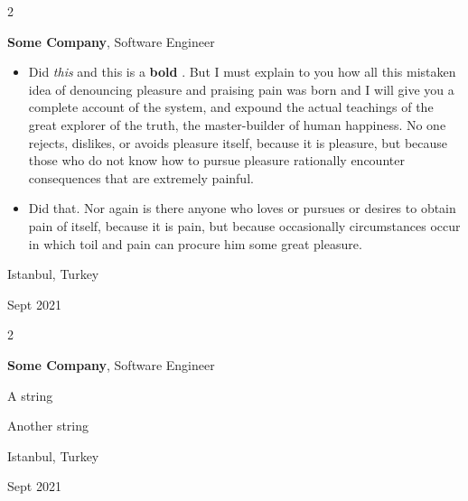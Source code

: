 \documentclass[10pt, letterpaper]{article}
\newenvironment{summary}{
    \begin{description}[
        topsep=0.10 cm,
        parsep=0.10 cm,
        partopsep=0pt,
        itemsep=0pt,
        leftmargin=0.4 cm + 10pt
    ]
}{
    \end{description}
} %
\newenvironment{highlights}{
    \begin{itemize}[
        topsep=0.10 cm,
        parsep=0.10 cm,
        partopsep=0pt,
        itemsep=0pt,
        leftmargin=0.4 cm + 10pt
    ]
}{
    \end{itemize}
} %
\newenvironment{twocolentry}[2][]{
    \onecolentry
    \def\secondColumn{#2}
    \setcolumnwidth{\fill, 4.5 cm}
    \begin{paracol}{2}
}{
    \switchcolumn \raggedleft \secondColumn
    \end{paracol}
    \endonecolentry
} %
\let\hrefWithoutArrow\href
\renewcommand{\href}[2]{\hrefWithoutArrow{#1}{\ifthenelse{\equal{#2}{}}{ }{#2 }\raisebox{.15ex}{\footnotesize \faExternalLink*}}}
\begin{document}
        \vspace{0.2 cm}

        \begin{twocolentry}{
            Istanbul, Turkey

        Sept 2021
        }
            \textbf{Some \textnormal{Company}}, Software Engineer
            \begin{highlights}
                \item Did \textit{this} and this is a \textbf{bold} \href{https://example.com}{link}. But I must explain to you how all this mistaken idea of denouncing pleasure and praising pain was born and I will give you a complete account of the system, and expound the actual teachings of the great explorer of the truth, the master-builder of human happiness. No one rejects, dislikes, or avoids pleasure itself, because it is pleasure, but because those who do not know how to pursue pleasure rationally encounter consequences that are extremely painful.
                \item Did that. Nor again is there anyone who loves or pursues or desires to obtain pain of itself, because it is pain, but because occasionally circumstances occur in which toil and pain can procure him some great pleasure.
            \end{highlights}
        \end{twocolentry}


        \vspace{0.2 cm}

        \begin{twocolentry}{
            Istanbul, Turkey

        Sept 2021
        }
            \textbf{Some \textnormal{Company}}, Software Engineer
            \begin{summary}
                \item A string
                \item Another string
            \end{summary}
        \end{twocolentry}


        \vspace{0.2 cm}
\end{document}
